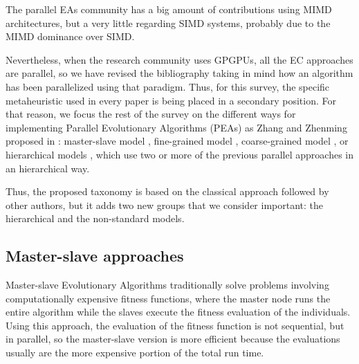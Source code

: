 \documentclass{article}
\begin{document}
The parallel EAs community has a big amount of contributions using 
MIMD architectures, but a very little regarding SIMD systems, probably due to the MIMD dominance over SIMD.

Nevertheless, when the research community uses GPGPUs, all the EC approaches are parallel, so we have revised the bibliography taking in mind how an algorithm has been parallelized using that paradigm. Thus, for this survey, the specific metaheuristic used in every paper is being placed in a secondary position.  
For that reason, we focus the rest of the survey on the different ways for implementing Parallel Evolutionary Algorithms (PEAs) as Zhang and Zhenming proposed in \cite{ZhangImplementationMasterSlave}: master-slave model \cite{man-leung-wong-parallel-2005}, fine-grained model \cite{jian_ming_li_efficient_2007}, coarse-grained model \cite{Maitre:2009:CGP:1569901.1570089}, %
or hierarchical models  \cite{DBLP:conf/gecco/PospichalMOSJ11},  which use two or more of the previous parallel approaches in an hierarchical way. 



Thus, the proposed taxonomy is based on the classical approach followed by other authors, but it adds two new groups that we consider important: the hierarchical and the non-standard models.

\subsection{Master-slave approaches}
\label{subsec:masterslaveapproaches}
Master-slave Evolutionary Algorithms traditionally solve problems
involving computationally expensive fitness functions, where the
master node runs the entire algorithm while the slaves execute the
fitness evaluation of the individuals. Using this approach, the
evaluation of the fitness function is not sequential, but in parallel,
so the master-slave version is more efficient because the evaluations
usually are the more expensive portion of the total run time.
\end{document}
